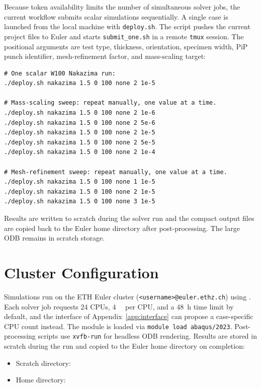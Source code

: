 Because  token availability limits the number of simultaneous solver
jobs, the current workflow submits scalar simulations sequentially. A single
case is launched from the local machine with \texttt{deploy.sh}. The script
pushes the current project files to Euler and starts \texttt{submit\_one.sh} in
a remote \texttt{tmux} session. The positional arguments are test type,
thickness, orientation, specimen width, PiP punch identifier, mesh-refinement
factor, and mass-scaling target:
\lstset{language=bash,numbers=none}
\begin{lstlisting}[frame=lines]
# One scalar W100 Nakazima run:
./deploy.sh nakazima 1.5 0 100 none 2 1e-5

# Mass-scaling sweep: repeat manually, one value at a time.
./deploy.sh nakazima 1.5 0 100 none 2 1e-6
./deploy.sh nakazima 1.5 0 100 none 2 5e-6
./deploy.sh nakazima 1.5 0 100 none 2 1e-5
./deploy.sh nakazima 1.5 0 100 none 2 5e-5
./deploy.sh nakazima 1.5 0 100 none 2 1e-4

# Mesh-refinement sweep: repeat manually, one value at a time.
./deploy.sh nakazima 1.5 0 100 none 1 1e-5
./deploy.sh nakazima 1.5 0 100 none 2 1e-5
./deploy.sh nakazima 1.5 0 100 none 3 1e-5
\end{lstlisting}

Results are written to scratch during the solver run and the compact output
files are copied back to the Euler home directory after post-processing. The
large ODB remains in scratch storage.

\section{Cluster Configuration}

Simulations run on the ETH Euler cluster
(\texttt{<username>@euler.ethz.ch}) using . Each solver job
requests 24 CPUs, \SI{4}{\giga\byte} per CPU, and a \SI{48}{\hour} time limit
by default, and the interface of Appendix~\ref{app:interface} can propose a
case-specific CPU count instead. The  module is loaded via
\texttt{module load abaqus/2023}. Post-processing scripts use
\texttt{xvfb-run} for headless ODB rendering. Results are stored in scratch
during the run and copied to the Euler home directory on completion:
\begin{itemize}
  \item Scratch directory: 
  \item Home directory: 
\end{itemize}

